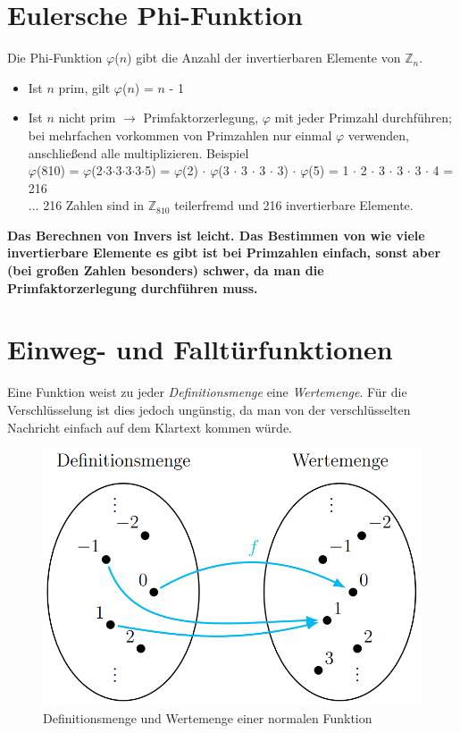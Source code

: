 \section{Eulersche Phi-Funktion}
Die Phi-Funktion $\varphi$($n$) gibt die Anzahl der invertierbaren Elemente von $\mathbb{Z}_{n}$.

\begin{itemize}
	\item Ist $n$ prim, gilt $\varphi$($n$) = $n$ - 1
	\item Ist $n$ nicht prim $\rightarrow$ Primfaktorzerlegung, $\varphi$ mit jeder Primzahl durchführen; bei mehrfachen vorkommen von Primzahlen nur einmal $\varphi$ verwenden, anschließend alle multiplizieren. Beispiel \\
	 $\varphi$(810) = $\varphi$(2$\cdot$3$\cdot$3$\cdot$3$\cdot$3$\cdot$5) = $\varphi$(2) $\cdot$ $\varphi$(3 $\cdot$ 3 $\cdot$ 3 $\cdot$ 3) $\cdot$ $\varphi$(5) = 1 $\cdot$ 2 $\cdot$ 3 $\cdot$ 3 $\cdot$ 3 $\cdot$ 4 = 216 \\
	 ... 216 Zahlen sind in $\mathbb{Z}_{810}$ teilerfremd und 216 invertierbare Elemente.
\end{itemize}

\textbf{Das Berechnen von Invers ist leicht. Das Bestimmen von wie viele invertierbare Elemente es gibt ist bei Primzahlen einfach, sonst aber (bei großen Zahlen besonders) schwer, da man die Primfaktorzerlegung durchführen muss.}

\section{Einweg- und Falltürfunktionen}
Eine Funktion weist zu jeder \textit{Definitionsmenge} eine \textit{Wertemenge}. Für die Verschlüsselung ist dies jedoch ungünstig, da man von der verschlüsselten Nachricht einfach auf dem Klartext kommen würde.
\begin{figure}[H]
	\centering
	\includegraphics[width=0.8\linewidth]{figures/normal_func.png}
	\caption{Definitionsmenge und Wertemenge einer normalen Funktion}
\end{figure}


